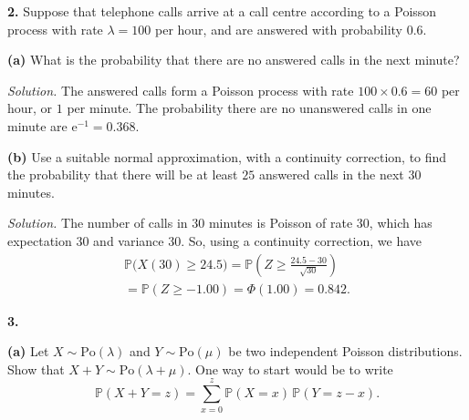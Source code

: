 \documentclass[
  a4paper,
]{article}
\theoremstyle{definition}
\theoremstyle{definition}
\theoremstyle{definition}
\theoremstyle{remark}
\begin{document}
\textbf{2.} Suppose that telephone calls arrive at a call centre according to a Poisson process with rate \(\lambda = 100\) per hour, and are answered with probability \(0.6\).

\textbf{(a)} What is the probability that there are no answered calls in the next minute?

\begin{myanswers}
\emph{Solution.}
The answered calls form a Poisson process with rate \(100 \times 0.6 = 60\) per hour, or \(1\) per minute. The probability there are no unanswered calls in one minute are \(\mathrm{e}^{-1} = 0.368\).

\end{myanswers}

\textbf{(b)} Use a suitable normal approximation, with a continuity correction, to find the probability that there will be at least \(25\) answered calls in the next \(30\) minutes.

\begin{myanswers}
\emph{Solution.}
The number of calls in \(30\) minutes is Poisson of rate \(30\), which has expectation \(30\) and variance \(30\). So, using a continuity correction, we have
\begin{multline} \mathbb P \big(X(30) \geq 24.5 \big) = \mathbb P \left( Z \geq \frac{24.5 - 30}{\sqrt{30}} \right) \\= \mathbb P(Z \geq -1.00 ) = \Phi(1.00) = 0.842 . \end{multline}

\end{myanswers}

\textbf{3.}

\textbf{(a)} Let \(X \sim \text{Po}(\lambda)\) and \(Y \sim \text{Po}(\mu)\) be two independent Poisson distributions. Show that \(X + Y \sim \text{Po}(\lambda + \mu)\). One way to start would be to write
\[ \mathbb P(X+Y = z) = \sum_{x=0}^z \mathbb P(X = x) \, \mathbb P(Y = z-x) . \]
\end{document}
